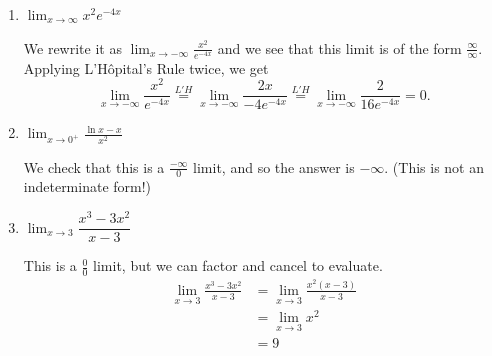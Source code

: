 \documentclass{article}
\begin{document}
\begin{enumerate}
\begin{enumerate}

    \item
        \begin{problem}
            $\displaystyle \lim_{x \to \infty} x^2  e^{-4x} $ 
        \end{problem}
        \pspace{\vfill}

        \begin{solution}
            We rewrite it as $\displaystyle\lim_{x \to -\infty} \frac{x^2}{e^{-4x}}$ and we see that this limit is of the form $\frac{\infty}{\infty}$. Applying L'H\^opital's Rule twice, we get
            $$\lim_{x \to -\infty} \frac{x^2}{e^{-4x}} \stackrel{L'H}{=} \lim_{x \to -\infty} \frac{2x}{-4e^{-4x}} \stackrel{L'H}{=} \lim_{x \to -\infty} \frac{2}{16e^{-4x}} = \boxed{0}.$$
        \end{solution}


\pspace{\newpage}


    \item
        \begin{problem}
            $\displaystyle \lim_{x \to 0^+} \frac{\ln x - x}{x^2}$
        \end{problem}
        \pspace{\vfill}

        \begin{solution}
            We check that this is a $\frac{-\infty}{0}$ limit, and so the answer is $\boxed{-\infty}$.
            (This is not an indeterminate form!)
        \end{solution}

        \item 
        \begin{problem} 
        $\displaystyle \lim_{x \to 3} \dfrac{x^3-3x^2}{x-3}$
        \end{problem}
        \pspace{\vfill}

        \begin{solution}
            This is a $\frac{0}{0}$ limit, but we can factor and cancel to evaluate.
            \begin{align*}
                \lim_{x\to3} \frac{x^3-3x^2}{x-3} 
                &= \lim_{x\to3} \frac{x^2(x-3)}{x-3} \\
                &= \lim_{x\to3} x^2 \\
                &= \boxed{9}
            \end{align*}
        \end{solution}



\end{enumerate}
\end{enumerate}
\end{document}
